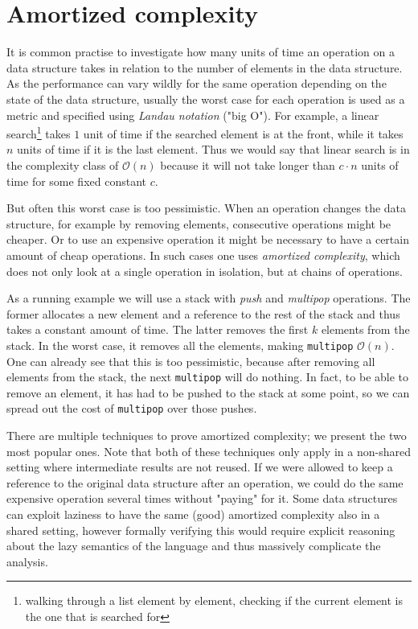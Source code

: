 \documentclass[sigplan,screen,review,anonymous]{acmart}
\renewcommand\O[1]{$\mathcal{O}(#1)$}
\begin{document}
\section{Amortized complexity}\label{sec:complexity}

It is common practise to investigate how many units of time an operation on a data structure takes in relation to the number of elements in the data structure. As the performance can vary wildly for the same operation depending on the state of the data structure, usually the worst case for each operation is used as a metric and specified using \textit{Landau notation} ("big O"). For example, a linear search\footnote{walking through a list element by element, checking if the current element is the one that is searched for} takes $1$ unit of time if the searched element is at the front, while it takes $n$ units of time if it is the last element. Thus we would say that linear search is in the complexity class of \O{n} because it will not take longer than $c \cdot n$ units of time for some fixed constant $c$.

But often this worst case is too pessimistic. When an operation changes the data structure, for example by removing elements, consecutive operations might be cheaper. Or to use an expensive operation it might be necessary to have a certain amount of cheap operations. In such cases one uses \textit{amortized complexity}, which does not only look at a single operation in isolation, but at chains of operations.

As a running example we will use a stack with \textit{push} and \textit{multipop} operations. The former allocates a new element and a reference to the rest of the stack and thus takes a constant amount of time. The latter removes the first $k$ elements from the stack. In the worst case, it removes all the elements, making \texttt{multipop} \O{n}. One can already see that this is too pessimistic, because after removing all elements from the stack, the next \texttt{multipop} will do nothing. In fact, to be able to remove an element, it has had to be pushed to the stack at some point, so we can spread out the cost of \texttt{multipop} over those pushes.

There are multiple techniques to prove amortized complexity; we present the two most popular ones. Note that both of these techniques only apply in a non-shared setting where intermediate results are not reused. If we were allowed to keep a reference to the original data structure after an operation, we could do the same expensive operation several times without "paying" for it. Some data structures can exploit laziness to have the same (good) amortized complexity also in a shared setting, however formally verifying this would require explicit reasoning about the lazy semantics of the language and thus massively complicate the analysis.
\end{document}
